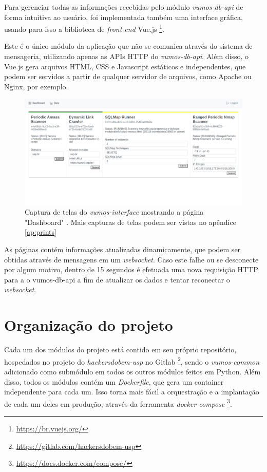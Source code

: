     Para gerenciar todas as informações recebidas pelo módulo \textit{vumos-db-api} de forma intuitiva ao usuário, foi implementada também uma interface gráfica, usando para isso a biblioteca de \textit{front-end} Vue.js \footnote{\url{https://br.vuejs.org/}}. 
    
    Este é o único módulo da aplicação que não se comunica através do sistema de mensageria, utilizando apenas as APIs HTTP do \textit{vumos-db-api}. Além disso, o Vue.js gera arquivos HTML, CSS e Javascript estáticos e independentes, que podem ser servidos a partir de qualquer servidor de arquivos, como Apache ou Nginx, por exemplo. 
    
    \begin{figure}[H]
        \includegraphics[scale=0.32]{figuras/vumos-interface-modules.png}
        \caption{Captura de telas do \textit{vumos-interface} mostrando a página "Dashboard" \label{fig:vumos-interface-modules}. Mais capturas de telas podem ser vistas no apêndice  \ref{ap:prints}}
    \end{figure}
    
    As páginas contém informações atualizadas dinamicamente, que podem ser obtidas através de mensagens em um \textit{websocket}. Caso este falhe ou se desconecte por algum motivo, dentro de 15 segundos é efetuada uma nova requisição HTTP para a o vumos-db-api a fim de atualizar os dados e tentar reconectar o \textit{websocket}.
    

\section{Organização do projeto}
    
    Cada um dos módulos do projeto está contido em seu próprio repositório, hospedados no projeto do \textit{hackersdobem-usp} no Gitlab  \footnote{\url{https://gitlab.com/hackersdobem-usp}}, sendo o \textit{vumos-common} adicionado como submódulo em todos os outros módulos feitos em Python. Além disso, todos os módulos contém um \textit{Dockerfile}, que gera um container independente para cada um. Isso torna mais fácil a orquestração e a implantação de cada um deles em produção, através da ferramenta \textit{docker-compose} \footnote{\url{https://docs.docker.com/compose/}}.
    
